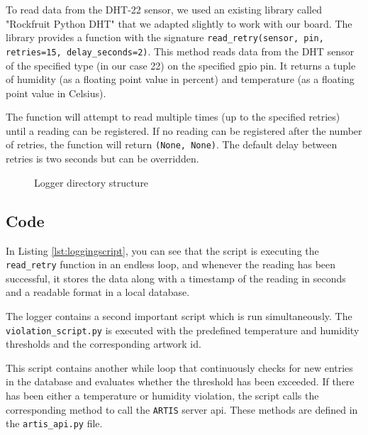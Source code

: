 To read data from the DHT-22 sensor, we used an existing library called "Rockfruit Python DHT" \cite{rockfruitpythondht} that we adapted slightly to work with our board. The library provides a function with the signature \texttt{read\_retry(sensor, pin, retries=15, delay\_seconds=2)}. This method reads data from the DHT sensor of the specified type (in our case 22) on the specified \gls{gpio} pin. It returns a tuple of humidity (as a floating point value in percent) and temperature (as a floating point value in Celsius). 

The function will attempt to read multiple times (up to the specified retries) until a reading can be registered. If no reading can be registered after the number of retries, the function will return \texttt{(None, None)}. The default delay between retries is two seconds but can be overridden.

\begin{figure}[ht]
    \centering
        
    \caption{Logger directory structure}
    \label{fig:artis-logger-filetree}
\end{figure}

\subsection{Code}


In Listing \ref{lst:loggingscript}, you can see that the script is executing the \texttt{read\_retry} function in an endless loop, and whenever the reading has been successful, it stores the data along with a timestamp of the reading in seconds and a readable format in a local database.

The logger contains a second important script which is run simultaneously. The \texttt{violation\_script.py} is executed with the predefined temperature and humidity thresholds and the corresponding artwork \gls{id}.



This script contains another while loop that continuously checks for new entries in the database and evaluates whether the threshold has been exceeded. If there has been either a temperature or humidity violation, the script calls the corresponding method to call the \texttt{ARTIS} server \gls{api}. These methods are defined in the \texttt{artis\_api.py} file.

